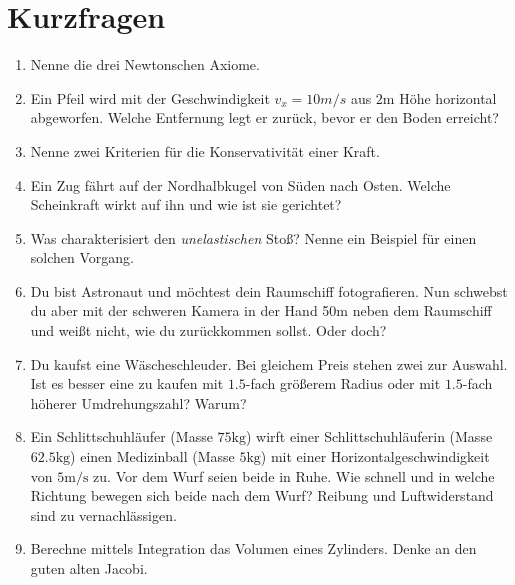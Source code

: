 \section{Kurzfragen}
\begin{enumerate}

  \item Nenne die drei Newtonschen Axiome.
  \item Ein Pfeil wird mit der Geschwindigkeit $v_x = 10 m/s$ aus $2\si{\meter}$ Höhe horizontal abgeworfen. Welche
        Entfernung legt er zurück, bevor er den Boden erreicht?
  \item Nenne zwei Kriterien für die Konservativität einer Kraft.
  \item Ein Zug fährt auf der Nordhalbkugel von Süden nach Osten. Welche Scheinkraft wirkt auf ihn und wie ist sie gerichtet?
  \item Was charakterisiert den \emph{unelastischen} Stoß? Nenne ein Beispiel für einen solchen Vorgang.
  \item Du bist Astronaut und möchtest dein Raumschiff fotografieren. Nun schwebst du aber mit der schweren Kamera in der Hand 50m
        neben dem Raumschiff und weißt nicht, wie du zurückkommen sollst. Oder doch?
  \item Du kaufst eine Wäscheschleuder. Bei gleichem Preis stehen zwei zur Auswahl.  Ist es besser eine zu kaufen mit $1.5$-fach
        größerem Radius oder mit $1.5$-fach höherer Umdrehungszahl? Warum?
  \item Ein Schlittschuhläufer (Masse $75\si{\kilo\gram}$) wirft einer Schlittschuhläuferin (Masse $62.5\si{\kilo\gram}$) einen
        Medizinball (Masse $5\si{\kilo\gram}$) mit einer Horizontalgeschwindigkeit von $5\si{\meter\per\second}$ zu. Vor dem Wurf
        seien beide in Ruhe. Wie schnell und in welche Richtung bewegen sich beide nach dem Wurf? Reibung und Luftwiderstand sind
        zu vernachlässigen.
  \item Berechne mittels Integration das Volumen eines Zylinders. Denke an den guten alten Jacobi.
\end{enumerate}

\newpage
